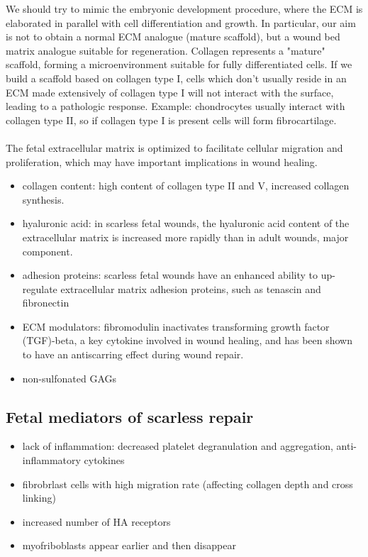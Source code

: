 We should try to mimic the embryonic development procedure, where the ECM is elaborated in parallel with cell differentiation and growth.
In particular, our aim is not to obtain a normal ECM analogue (mature scaffold), but a wound bed matrix analogue suitable for regeneration.
Collagen represents a "mature" scaffold, forming a microenvironment suitable for fully differentiated cells.  If we build a scaffold based on collagen type I, cells which don't usually reside in an ECM made extensively of collagen type I will not interact with the surface, leading to a pathologic response. Example: chondrocytes usually interact with collagen type II, so if collagen type I is present cells will form fibrocartilage. 
\\
\\
\noindent
The fetal extracellular matrix is optimized to facilitate cellular migration and proliferation, which may have important implications in wound healing.
\begin{itemize}
\item collagen content: high content of collagen type II and V, increased collagen synthesis. 
\item hyaluronic acid: in scarless fetal wounds, the hyaluronic acid content of the extracellular matrix is increased more rapidly than in adult wounds, major component.
\item adhesion proteins: scarless fetal wounds have an enhanced ability to up-regulate extracellular matrix adhesion proteins, such as tenascin and fibronectin
\item ECM modulators: fibromodulin inactivates transforming growth factor (TGF)-beta, a key cytokine involved in wound healing, and has been shown to have an antiscarring effect during wound repair.
\item non-sulfonated GAGs
\end{itemize}

\subsection{Fetal mediators of scarless repair}
\begin{itemize}
\item lack of inflammation: decreased platelet degranulation and aggregation,  anti-inflammatory cytokines
\item fibrobrlast cells with high migration rate (affecting collagen depth and cross linking)
\item increased number of HA receptors
\item myofriboblasts appear earlier and then disappear
\end{itemize}

